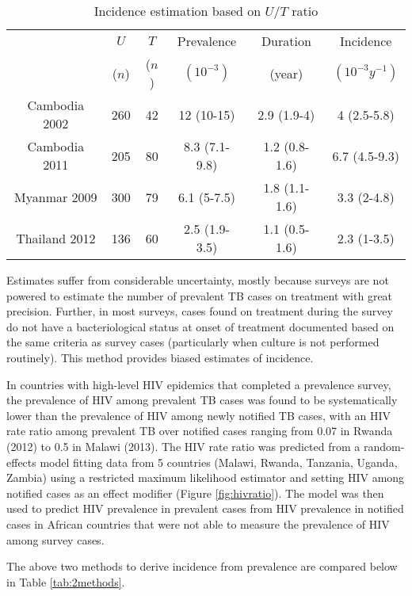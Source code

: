\begin{table}
    \begin{tabular}{ c c c c c c }
    \hline
         & $U$ & $T$ & Prevalence & Duration & Incidence \\ 
         &  ($n$)   & ($n$)    & $(10^{-3})$ & (year)    & $(10^{-3}y^{-1})$ \\
     \hline
        Cambodia 2002 & 260 & 42 & 12 (10-15) & 2.9 (1.9-4) & 4 (2.5-5.8) \\ 
        Cambodia 2011 & 205 & 80 & 8.3 (7.1-9.8) & 1.2 (0.8-1.6) & 6.7 (4.5-9.3) \\ 
        Myanmar 2009 & 300 & 79 & 6.1 (5-7.5) & 1.8 (1.1-1.6) & 3.3 (2-4.8) \\ 
        Thailand 2012 & 136 & 60 & 2.5 (1.9-3.5) & 1.1 (0.5-1.6) & 2.3 (1-3.5) \\ 
    \hline
    \end{tabular} 
    \caption{Incidence estimation based on $U/T$ ratio
    \label{tab:method2}} 
\end{table}

Estimates suffer from considerable uncertainty, mostly because surveys are not powered to estimate the number of prevalent TB cases on treatment with great precision. Further, in most surveys, cases found on treatment during the survey do not have a bacteriological status at onset of treatment documented based on the same criteria as survey cases (particularly when culture is not performed routinely). This method provides biased estimates of incidence. 

In countries with high-level HIV epidemics that completed a prevalence survey, the prevalence of HIV among prevalent TB cases was found to be systematically lower than the prevalence of HIV among newly notified TB cases, with an HIV rate ratio among prevalent TB over notified cases ranging from 0.07 in Rwanda (2012) to 0.5 in Malawi (2013). The HIV rate ratio was predicted from a random-effects model fitting data from 5 countries (Malawi, Rwanda, Tanzania, Uganda, Zambia) using a restricted maximum likelihood estimator and setting HIV among notified cases as an effect modifier (Figure \ref{fig:hivratio}). The model was then used to predict HIV prevalence in prevalent cases from HIV prevalence in notified cases in African countries that were not able to measure the prevalence of HIV among survey cases.

The above two methods to derive incidence from prevalence are compared below in Table \ref{tab:2methods}.


